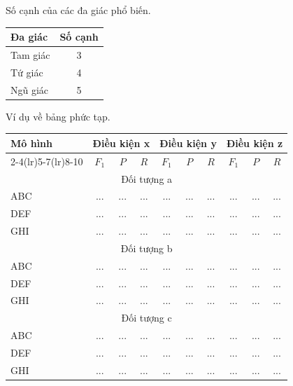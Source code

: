 \documentclass[thesis]{femathesis}
\begin{document}
\begin{table}[h]{Số cạnh của các đa giác phổ biến.}
    \label{tab:ex2}
    \centering\small
    \begin{tabular}{lc}
        \toprule
        Đa giác & Số cạnh \\
        \midrule
        Tam giác & 3 \\
        Tứ giác & 4  \\
        Ngũ giác & 5 \\
        \bottomrule
    \end{tabular}
\end{table}

\begin{table}[]{Ví dụ về bảng phức tạp.}
    \label{tab:detection-perf}
    \centering\small
    \begin{tabular}{lccccccccc}
        \toprule
        \multirow{2}{*}{Mô hình} & \multicolumn{3}{c}{Điều kiện x} & \multicolumn{3}{c}{Điều kiện y} & \multicolumn{3}{c}{Điều kiện z} \\
        \cmidrule(lr){2-4}\cmidrule(lr){5-7}\cmidrule(lr){8-10}
         & $F_1$ & $P$ & $R$ & $F_1$ & $P$ & $R$ & $F_1$ & $P$ & $R$ \\
        
        \midrule
        \multicolumn{10}{c}{Đối tượng a}\\
        
        \midrule
        ABC & ... & ... & ... & ... & ... & ... & ... & ... & ... \\ 
        DEF & ... & ... & ... & ... & ... & ... & ... & ... & ... \\
        GHI & ... & ... & ... & ... & ... & ... & ... & ... & ... \\
        
        \midrule
        \multicolumn{10}{c}{Đối tượng b}\\
         
        \midrule
        ABC & ... & ... & ... & ... & ... & ... & ... & ... & ... \\ 
        DEF & ... & ... & ... & ... & ... & ... & ... & ... & ... \\
        GHI & ... & ... & ... & ... & ... & ... & ... & ... & ... \\
        
        \midrule
        \multicolumn{10}{c}{Đối tượng c}\\
        
        \midrule
        ABC & ... & ... & ... & ... & ... & ... & ... & ... & ... \\ 
        DEF & ... & ... & ... & ... & ... & ... & ... & ... & ... \\
        GHI & ... & ... & ... & ... & ... & ... & ... & ... & ... \\


\end{tabular}
\end{table}
\end{document}

